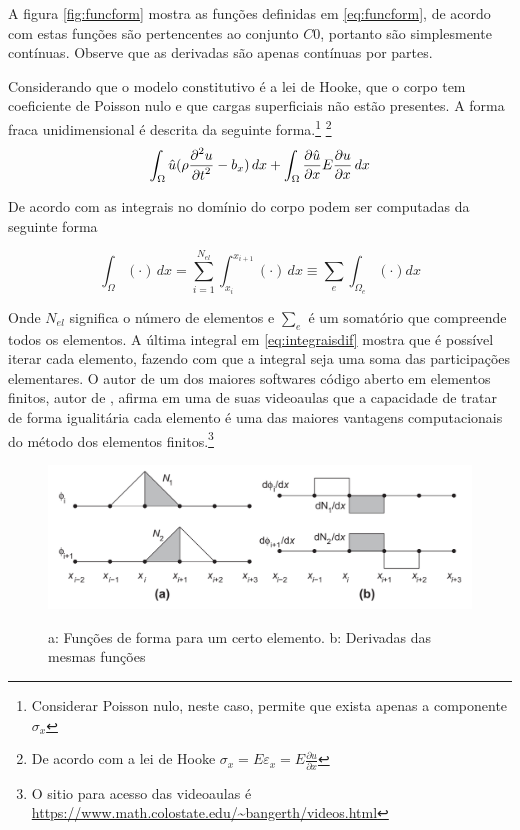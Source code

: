 A figura \ref{fig:funcform} mostra as funções definidas em \ref{eq:funcform}, de acordo com \cite{zienkiewicz2013} estas funções são pertencentes ao conjunto $C0$, portanto são simplesmente contínuas. Observe que as derivadas são apenas contínuas por partes.

Considerando que o modelo constitutivo é a lei de Hooke, que o corpo tem coeficiente de Poisson nulo e que cargas superficiais não estão presentes. A forma fraca unidimensional é descrita da seguinte forma.\footnote{Considerar Poisson nulo, neste caso, permite que exista apenas a componente $ \sigma_x $} \footnote{De acordo com a lei de Hooke $ \sigma_x = E \varepsilon_x = E \frac{\partial u}{ \partial x} $}
\begin{equation}
    \int_{\Omega} \hat{u} (\rho \frac{\displaystyle \partial^2 u}{\displaystyle \partial t^2} - b_x) \, dx + \int_{\Omega} \frac{\displaystyle \partial \hat{u}}{\displaystyle \partial x} E \frac{\displaystyle \partial u}{\displaystyle  \partial x} \,  dx
\end{equation}

De acordo com \cite{zienkiewicz2013}  as integrais no domínio do corpo podem ser computadas da seguinte forma

\begin{equation} \label{eq:integraisdif}
    \int_{\Omega} (\cdot) \, dx = \sum_{i = 1}^{N_{el}} \int_{x_i}^{x_{i+1}} (\cdot) \, dx \equiv \sum_{e} \int_{\Omega_e} (\cdot) dx
\end{equation}

Onde $ N_{el} $ significa o número de elementos e $\sum_e$ é um somatório que compreende todos os elementos. A última integral em \ref{eq:integraisdif} mostra que é possível iterar cada elemento, fazendo com que a integral seja uma soma das participações elementares. O autor de um dos maiores softwares código aberto em elementos finitos, autor de  \cite{BangerthHartmannKanschat2007}, afirma em uma de suas videoaulas que a capacidade de tratar de forma igualitária cada elemento é uma das maiores vantagens computacionais do método dos elementos finitos.\footnote{O sitio para acesso das videoaulas é \url{https://www.math.colostate.edu/~bangerth/videos.html}} \\

\begin{figure}
    \centering
    \caption{a: Funções de forma para um certo elemento. b: Derivadas das mesmas funções}
    \includegraphics[width=0.8\linewidth]{images/funcformaverdade.png}
    \label{fig:funcformverd}
\end{figure}

